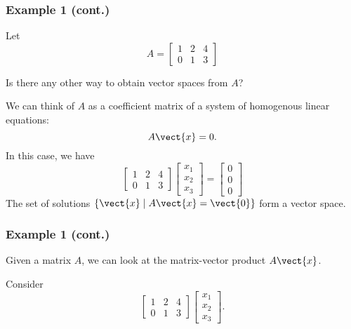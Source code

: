 \begin{frame}
  \frametitle{Example 1 (cont.)}

  Let
  \[
  A =
  \begin{bmatrix}
    1 & 2 & 4 \\
    0 & 1 & 3
  \end{bmatrix}
  \]

  Is there any other way to obtain vector spaces from $A$?  \pause

  \vspace{0.2in}

  We can think of $A$ as a coefficient matrix of a system of
  homogenous linear equations:
  \[
  A\vect{x} = 0.
  \]
  In this case, we have
  \[
  \begin{bmatrix}
    1 & 2 & 4 \\
    0 & 1 & 3
  \end{bmatrix}
  \begin{bmatrix}
    x_1\\ x_2 \\ x_3
  \end{bmatrix}
  =
  \begin{bmatrix}
    0\\ 0\\ 0
  \end{bmatrix}
  \]
  \pause
  The set of solutions $\{\vect{x} \;|\; A\vect{x}=\vect{0} \}$ form a vector space.
\end{frame}

\begin{frame}
  \frametitle{Example 1 (cont.)}

  Given a matrix $A$, we can look at the matrix-vector product $A\vect{x}$.

  Consider
  \[
  \begin{bmatrix}
    1 & 2 & 4 \\
    0 & 1 & 3
  \end{bmatrix}
  \begin{bmatrix}
    x_1\\ x_2 \\x_3
  \end{bmatrix}.
  \]

  \vspace{2in}
\end{frame}

